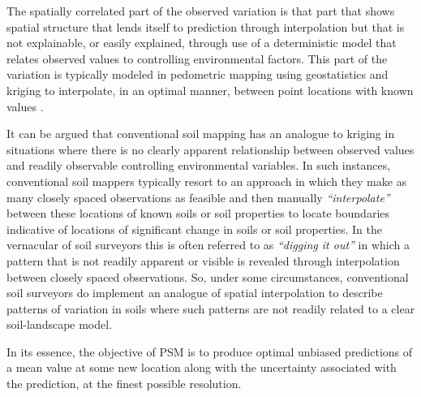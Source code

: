 \documentclass[graybox,natbib,nospthms,UStrade]{svmono}
\let\BeginKnitrBlock\begin \let\EndKnitrBlock\end
\let\BeginKnitrBlock\begin \let\EndKnitrBlock\end
\begin{document}
The spatially correlated part of the observed variation is that part
that shows spatial structure that lends itself to prediction through
interpolation but that is not explainable, or easily explained, through
use of a deterministic model that relates observed values to controlling
environmental factors. This part of the variation is typically modeled in pedometric
mapping using geostatistics and kriging to interpolate, in an optimal
manner, between point locations with known values
\citep{goovaerts2001geostatistical, McBratney2003Geoderma}.

It can be argued that conventional soil mapping has an analogue to
kriging in situations where there is no clearly apparent relationship
between observed values and readily observable controlling environmental
variables. In such instances, conventional soil mappers typically resort
to an approach in which they make as many closely spaced observations as
feasible and then manually \emph{``interpolate''} between these locations of
known soils or soil properties to locate boundaries indicative of
locations of significant change in soils or soil properties. In the
vernacular of soil surveyors this is often referred to as \emph{``digging it
out''} in which a pattern that is not readily apparent or visible is
revealed through interpolation between closely spaced observations. So,
under some circumstances, conventional soil surveyors do implement an
analogue of spatial interpolation to describe patterns of variation in
soils where such patterns are not readily related to a clear
soil-landscape model.

\BeginKnitrBlock{rmdnote}
In its essence, the objective
of PSM is to produce optimal unbiased predictions of a mean value at some new location along with the uncertainty associated with the prediction, at the finest possible resolution.
\EndKnitrBlock{rmdnote}
\end{document}
